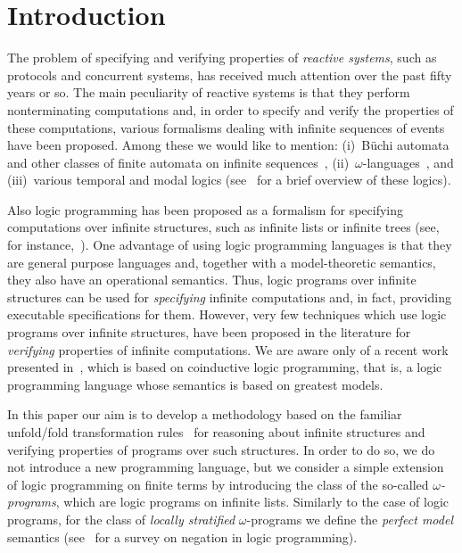 \documentclass[english]{tlp}
\begin{document}
\section{Introduction
\label{sec:introduction}}The problem of specifying and verifying
properties of {\em reactive systems}, such as protocols and
concurrent systems, has received much attention over the past fifty
years or so. The main peculiarity of reactive systems is that they
perform nonterminating computations and, in order to specify and
verify the properties of these computations, various formalisms
dealing with infinite sequences of events have been proposed. Among
these we would like to mention: (i)~B\"uchi automata and other
classes of finite automata on infinite sequences~\cite{Tho90},
(ii)~$\omega$-languages~\cite{Sta97}, and (iii)~various temporal and
modal logics (see~\cite{Cl&99} for a brief overview of these
logics).

Also logic programming has been proposed as a formalism for
specifying computations over infinite structures, such as infinite
lists or infinite trees (see, for
instance,~\cite{Col82,Llo87,Si&06,MiG09}). One advantage of using
logic programming languages is that they are general purpose
languages and, together with a model-theoretic semantics, they also have
an operational semantics. Thus, logic programs over infinite
structures can be used for {\em specifying\/} infinite computations
and, in fact, providing executable specifications for them. However,
very few techniques which use logic programs over infinite
structures, have been proposed in the literature for {\em verifying\/}
properties of infinite computations. We are aware only of a recent
work presented in~\cite{Gu&07}, which is based on {\rm coinductive}
logic programming, that is, a logic programming language whose
semantics is based on greatest models.

In this paper our aim is to develop a 
methodology based on the familiar unfold/fold transformation rules~\cite{BuD77,TaS84} 
for reasoning about infinite structures and verifying properties
of programs over such structures. In order to do so,
we do not introduce a new 
programming language, but we consider a simple 
extension of logic programming on finite terms by introducing
the class of the so-called {\em $\omega$-programs}, which are 
logic programs on infinite lists. 
Similarly to the case of logic programs,
for the class of {\em locally stratified}  $\omega$-programs
we define the {\em perfect model}
semantics (see~\cite{ApB94} for a survey on negation in 
logic programming). 
\end{document}
